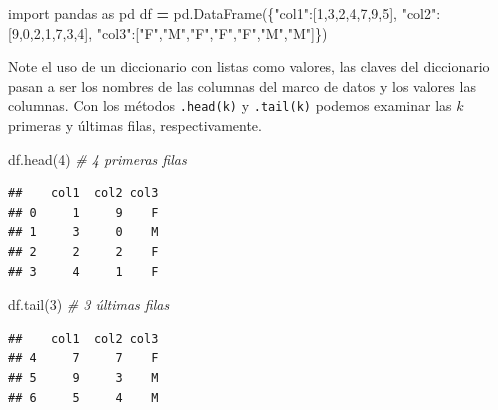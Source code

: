 \documentclass[
]{book}
\newenvironment{Shaded}{\begin{snugshade}}{\end{snugshade}}
\newcommand{\CommentTok}[1]{\textcolor[rgb]{0.56,0.35,0.01}{\textit{#1}}}
\newcommand{\DecValTok}[1]{\textcolor[rgb]{0.00,0.00,0.81}{#1}}
\newcommand{\ImportTok}[1]{#1}
\newcommand{\NormalTok}[1]{#1}
\newcommand{\OperatorTok}[1]{\textcolor[rgb]{0.81,0.36,0.00}{\textbf{#1}}}
\newcommand{\StringTok}[1]{\textcolor[rgb]{0.31,0.60,0.02}{#1}}
\theoremstyle{definition}
\theoremstyle{definition}
\theoremstyle{definition}
\theoremstyle{definition}
\theoremstyle{remark}
\begin{document}
\begin{Shaded}
\begin{Highlighting}[]
\ImportTok{import}\NormalTok{ pandas }\ImportTok{as}\NormalTok{ pd}
\NormalTok{df }\OperatorTok{=}\NormalTok{ pd.DataFrame(\{}\StringTok{"col1"}\NormalTok{:[}\DecValTok{1}\NormalTok{,}\DecValTok{3}\NormalTok{,}\DecValTok{2}\NormalTok{,}\DecValTok{4}\NormalTok{,}\DecValTok{7}\NormalTok{,}\DecValTok{9}\NormalTok{,}\DecValTok{5}\NormalTok{],}
                   \StringTok{"col2"}\NormalTok{:[}\DecValTok{9}\NormalTok{,}\DecValTok{0}\NormalTok{,}\DecValTok{2}\NormalTok{,}\DecValTok{1}\NormalTok{,}\DecValTok{7}\NormalTok{,}\DecValTok{3}\NormalTok{,}\DecValTok{4}\NormalTok{],}
                   \StringTok{"col3"}\NormalTok{:[}\StringTok{"F"}\NormalTok{,}\StringTok{"M"}\NormalTok{,}\StringTok{"F"}\NormalTok{,}\StringTok{"F"}\NormalTok{,}\StringTok{"F"}\NormalTok{,}\StringTok{"M"}\NormalTok{,}\StringTok{"M"}\NormalTok{]\})}
\end{Highlighting}
\end{Shaded}

Note el uso de un diccionario con listas como valores, las claves del diccionario pasan a ser los nombres de las columnas del marco de datos y los valores las columnas. Con los métodos \texttt{.head(k)} y \texttt{.tail(k)} podemos examinar las \(k\) primeras y últimas filas, respectivamente.

\begin{Shaded}
\begin{Highlighting}[]
\NormalTok{df.head(}\DecValTok{4}\NormalTok{) }\CommentTok{\# 4 primeras filas }
\end{Highlighting}
\end{Shaded}

\begin{verbatim}
##    col1  col2 col3
## 0     1     9    F
## 1     3     0    M
## 2     2     2    F
## 3     4     1    F
\end{verbatim}

\begin{Shaded}
\begin{Highlighting}[]
\NormalTok{df.tail(}\DecValTok{3}\NormalTok{) }\CommentTok{\# 3 últimas filas }
\end{Highlighting}
\end{Shaded}

\begin{verbatim}
##    col1  col2 col3
## 4     7     7    F
## 5     9     3    M
## 6     5     4    M
\end{verbatim}
\end{document}
